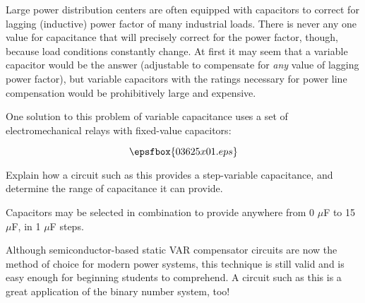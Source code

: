 

Large power distribution centers are often equipped with capacitors to correct for lagging (inductive) power factor of many industrial loads.  There is never any one value for capacitance that will precisely correct for the power factor, though, because load conditions constantly change.  At first it may seem that a variable capacitor would be the answer (adjustable to compensate for {\it any} value of lagging power factor), but variable capacitors with the ratings necessary for power line compensation would be prohibitively large and expensive.

One solution to this problem of variable capacitance uses a set of electromechanical relays with fixed-value capacitors:

$$\epsfbox{03625x01.eps}$$

Explain how a circuit such as this provides a step-variable capacitance, and determine the range of capacitance it can provide.







Capacitors may be selected in combination to provide anywhere from 0 $\mu$F to 15 $\mu$F, in 1 $\mu$F steps.







Although semiconductor-based static VAR compensator circuits are now the method of choice for modern power systems, this technique is still valid and is easy enough for beginning students to comprehend.  A circuit such as this is a great application of the binary number system, too!




